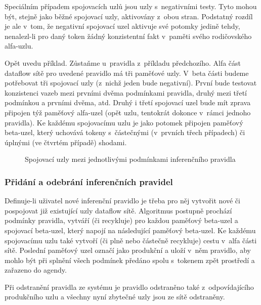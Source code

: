 Speciálním případem spojovacích uzlů jsou uzly s~negativními testy. Tyto
mohou být, stejně jako běžné spojovací uzly, aktivovány z~obou stran.
Podstatný rozdíl je ale v~tom, že negativní spojovací uzel aktivuje své
potomky jedině tehdy, nenalezl-li pro daný token žádný konzistentní fakt
v~paměti svého rodičovského alfa-uzlu.

Opět uvedu příklad. Zůstaňme u~pravidla z~příkladu předchozího. Alfa část
dataflow sítě pro uvedené pravidlo má tři paměťové uzly. V~beta části
budeme potřebovat tři spojovací uzly (z~nichž jeden bude negativní).
První bude testovat konzistenci vazeb mezi prvními dvěma podmínkami
pravidla, druhý mezi třetí podmínkou a prvními dvěma, atd. Druhý i třetí
spojovací uzel bude mít zprava připojen týž paměťový alfa-uzel (opět
 uzlu, tentokrát dokonce v~rámci jednoho pravidla). Ke každému
spojovacímu uzlu je jako potomek připojen paměťový beta-uzel, který
uchovává tokeny s~částečnými (v~prvních třech případech) či úplnými
(ve čtvrtém případě) shodami.

\begin{figure}[h]
\centerline{}
\caption{Spojovací uzly mezi jednotlivými podmínkami inferenčního pravidla\cite{doorenbos}}
\label{condition-joining}
\end{figure}
\subsubsection{Přidání a odebrání inferenčních pravidel}
Definuje-li uživatel nové inferenční pravidlo je třeba pro něj vytvořit
nové či pospojovat již existující uzly dataflow sítě. Algoritmus postupně
prochází podmínky pravidla, vytváří (či recykluje) pro každou paměťový
beta-uzel a spojovací beta-uzel, který napojí na následující paměťový beta-uzel.
Ke každému spojovacímu uzlu také vytvoří (či plně nebo částečně recykluje)
cestu v~alfa části sítě. Poslední paměťový uzel označí jako produkční
a uloží v~něm pravidlo, aby mohlo být při splnění všech podmínek předáno
spolu s~tokenem zpět prostředí a zařazeno do agendy.

Při odstranění pravidla ze systému je pravidlo odstraněno také z~odpovídajícího
produkčního uzlu a všechny nyní zbytečné uzly jsou ze sítě odstraněny.
